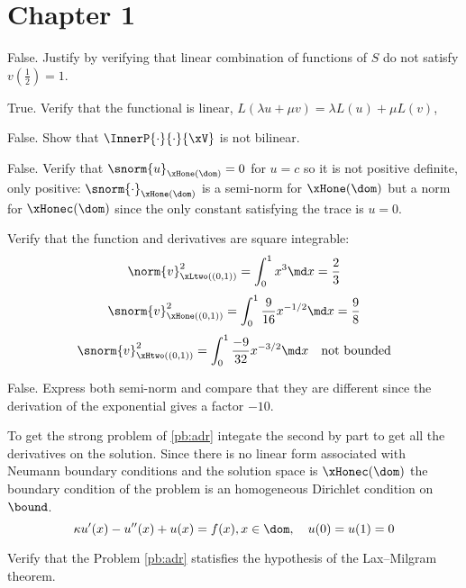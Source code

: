 
\section{Chapter 1}

\begin{tmasltn}{1.1}

\begin{tmatsks}
\item False. Justify by verifying that linear combination of functions of $S$ do not satisfy $v(\frac{1}{2}) = 1$.
\item True. Verify that the functional is linear, $L(\lambda u + \mu v) = \lambda L(u) + \mu L(v)$,
\item False. Show that $\InnerP{\cdot}{\cdot}{\xV}$ is not bilinear.
\item False. Verify that $\snorm{u}_{\xHone(\dom)} = 0$ for $u = c$ so it is not positive definite, only positive: $\snorm{\cdot}_{\xHone(\dom)}$ is a semi-norm for $\xHone(\dom)$ but a norm for $\xHonec(\dom)$ since the only constant satisfying the trace is $u = 0$.
\item Verify that the function and derivatives are square integrable:
\begin{equation*}
 \norm{v}^2_{\xLtwo((0,1))} = \int_{0}^{1} x^3 \md x = \frac{2}{3}
\end{equation*}
\begin{equation*}
 \snorm{v}^2_{\xHone((0,1))} = \int_{0}^{1} \frac{9}{16} x^{-1/2} \md x = \frac{9}{8}
\end{equation*}
\begin{equation*}
 \snorm{v}^2_{\xHtwo((0,1))} = \int_{0}^{1} \frac{-9}{32} x^{-3/2} \md x\quad \mbox{not bounded}
\end{equation*}
\item False. Express both semi-norm and compare that they are different since the derivation of the exponential gives a factor $-10$.
\end{tmatsks}
\end{tmasltn}

\begin{tmasltn}{1.2}
\begin{tmatsks}
\item To get the strong problem of \eqref{pb:adr} integate the second by part to get all the derivatives on the solution. Since there is no linear form associated with Neumann boundary conditions and the solution space is $\xHonec(\dom)$ the boundary condition of the problem is an homogeneous Dirichlet condition on $\bound$.
\begin{equation*}
 \kappa u'(x) - u''(x) + u(x) = f(x), x\in\dom,\quad u(0) = u(1) = 0
\end{equation*}
\item Verify that the Problem \eqref{pb:adr} statisfies the hypothesis of the Lax--Milgram theorem.
\end{tmatsks}
\end{tmasltn}

